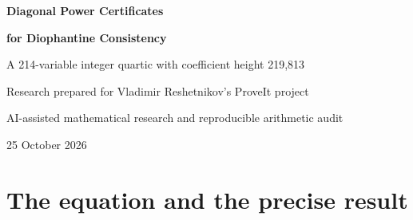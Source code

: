 \documentclass[11pt,a4paper]{article}
\theoremstyle{definition}
\newcommand{\Z}{\mathbb Z}
\newcommand{\Qdiag}{Q_{214}}
\begin{document}
\begin{center}
{\Large\bfseries\color{ink} Diagonal Power Certificates\par}
\vspace{3pt}
{\Large\bfseries\color{ink} for Diophantine Consistency\par}
\vspace{10pt}
{\large A 214-variable integer quartic with coefficient height 219,813\par}
\vspace{12pt}
{Research prepared for Vladimir Reshetnikov's ProveIt project\par}
{\small AI-assisted mathematical research and reproducible arithmetic audit\par}
\vspace{5pt}
{25 October 2026\par}
\end{center}

\begin{abstract}
We give an explicit polynomial $\Qdiag\in\Z[x_0,\ldots,x_{213}]$,
of degree four and coefficient height $219{,}813$, for which ZFC proves
that absence of an integer zero is equivalent to its usual arithmetized
consistency statement. The polynomial is the sum of squares of 153
displayed quadratic residuals; its collected expansion has 5,656 monomials.
The construction modifies ProveIt package 173's direct C222 consistency
encoding. Its growth certificate is replaced by
\[
 t=464+z^2,\qquad K=464t^2,\qquad F=K^K.
\]
The power is represented by the existing ordinary polynomial Pell
certificate: the already authenticated index $K$ also serves as the base.
A positive-coefficient estimate for the actual C222 formula codes proves
that this growth suffices, allowing one intermediate variable and one
quadratic residual to be removed. At 214 variables and degree four, the
new height is more than five million times smaller than that of package
173's existing 214-variable companion, at the cost of 170 additional
monomials. Earlier self-power constructions are explicitly credited.
This is a concrete tradeoff within a direct small-coefficient construction,
not a claim of global simplicity or a new universal-polynomial record.
The ordinary proof uses identified inherited Pell and logical calibration
theorems. Exact independent arithmetic checks accompany it; a new
end-to-end proof-assistant formalization is not claimed.
\end{abstract}

\section{The equation and the precise result}
\end{document}
